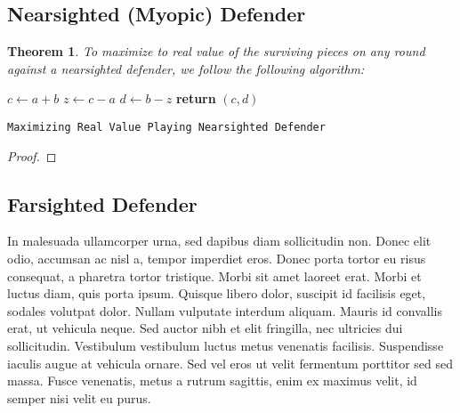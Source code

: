\documentclass{article}
\theoremstyle{plain}
\newtheorem{thm}{Theorem}[section]
\theoremstyle{definition}
\theoremstyle{remark}
\begin{document}

\subsection{Nearsighted (Myopic) Defender}

\begin{thm}
To maximize to real value of the surviving pieces on any round against a nearsighted defender, we follow the following algorithm:
\end{thm}

\begin{center}
	\begin{minipage}{1\linewidth} %
		\begin{algorithm}[H]
			\medskip
			$c \leftarrow a + b$ \;
			$z \leftarrow c - a$ \;
			$d \leftarrow b - z$ \;
			{\bf return} $(c,d)$ \;
			\caption{\texttt{Maximizing Real Value Playing Nearsighted Defender}} %
			\label{alg:nearsighted}   %
		\end{algorithm}
	\end{minipage}
\end{center}

\begin{proof}

\end{proof}


	

\subsection{Farsighted Defender}

In malesuada ullamcorper urna, sed dapibus diam sollicitudin non. Donec elit odio, accumsan ac nisl a, tempor imperdiet eros. Donec porta tortor eu risus consequat, a pharetra tortor tristique. Morbi sit amet laoreet erat. Morbi et luctus diam, quis porta ipsum. Quisque libero dolor, suscipit id facilisis eget, sodales volutpat dolor. Nullam vulputate interdum aliquam. Mauris id convallis erat, ut vehicula neque. Sed auctor nibh et elit fringilla, nec ultricies dui sollicitudin. Vestibulum vestibulum luctus metus venenatis facilisis. Suspendisse iaculis augue at vehicula ornare. Sed vel eros ut velit fermentum porttitor sed sed massa. Fusce venenatis, metus a rutrum sagittis, enim ex maximus velit, id semper nisi velit eu purus.
\end{document}
